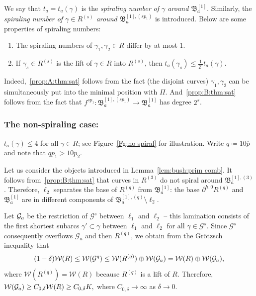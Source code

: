 \documentclass{amsart}
\newcommand{\bush}{{\mathfrak B }}
\newcommand{\1}{{\mathbb 1 }}
\newcommand{\FamG}{{\mathcal G}}
\newcommand{\Width}{{\mathcal W}}
\begin{document}
We say that $t_a=t_a(\gamma)$ is the \emph{spiraling number of $\gamma$ around $\bush^{[1]}_a$.} Similarly,  the \emph{spiraling number of $\gamma\in R^{(s)}$ around $\bush^{[1],(sp_1)}_a$} is introduced. Below are some properties of spiraling numbers:
\begin{enumerate}[label=\text{(\Alph*)},font=\normalfont,leftmargin=*]
\item \label{prop:A:thm:sat} The spiraling numbers of $\gamma_1,\gamma_2\in R$ differ by at most $1$. 
\item  \label{prop:B:thm:sat} If $\gamma_s\in R^{(s)}$ is the lift of $\gamma\in R$ into $R^{(s)}$, then $t_a(\gamma_s)\le \frac{1}{2^s} t_a(\gamma)$.  
\end{enumerate}
Indeed,~\ref{prop:A:thm:sat} follows from the fact (the disjoint curves) $\gamma_1,\gamma_2$ can be simultaneously put into the minimal position with $\Pi$. And~\ref{prop:B:thm:sat} follows from the fact that $f^{sp_1}\colon\bush^{[1],(sp_1)}_a\to \bush^{[1]}_a $ has degree $2^s$.




\subsubsection{The non-spiraling case:} $t_a(\gamma)\le 4$ for all $\gamma\in R$; see Figure~\ref{Fg:no spiral} for illustration. Write $q\coloneqq 10 \overline p$ and note that $qp_1>10 p_2$.

Let us consider the objects introduced in Lemma~\ref{lem:bush:prim comb}. It follows from~\ref{prop:B:thm:sat} that curves in $R^{(3)}$ do not spiral around $\bush^{[1],(3)}_a$. Therefore, $\ell_2$ separates the base of $R^{(q)}$ from $\bush_a^{[1]}$:  the base $\partial ^{h,0} R^{(q)}$ and $\bush_a^{[1]}$ are in different components of $\bush^{[1],(q)}_a\setminus \ell_2$.



Let ${\mathcal G}_a$ be the restriction of $\FamG^{s}$ between $\ell_1$ and $\ell_2$ -- this lamination consists of the first shortest subarcs $\gamma'\subset \gamma$ between $\ell_1$ and $\ell_2$ for all $\gamma\in \FamG^s$. Since $\FamG^s$ consequently overflows $\FamG_a$ and then $R^{(q)}$, we obtain from the Gr\"otzsch inequality that
\begin{equation}
\label{eq:Grotzsch:ineq}
  (1-\delta)\Width(R)\le \Width(\FamG^{q})\le \Width( R^{(q)})\oplus \Width(\GG_a)=\Width( R)\oplus \Width(\GG_a),
\end{equation}
where $\Width( R^{(q)})=\Width(R)$ because $ R^{(q)}$ is a lift of $R$. Therefore, $\Width(\GG_a)\ge C_{0,\delta} \Width(R)\ge C_{0,\delta} K,$ where $C_{0,\delta}\to \infty$ as $\delta\to 0$. 
\end{document}
